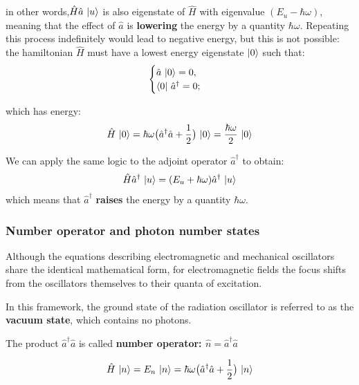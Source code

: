 in other words,$\hat{H}\hat{a}\, \ket{u}$ is also eigenstate of $\hat{H}$ with eigenvalue $(E_u-\hbar\omega)$, meaning that the effect of $\hat{a}$ is \textbf{lowering} the energy by a quantity $\hbar \omega$. Repeating this process indefinitely would lead to negative energy, but this is not possible: the hamiltonian $\hat{H}$ must have a lowest energy eigenstate $\ket{0}$ such that:
\begin{equation}\label{eqn:11-ground-state}
\begin{cases}
    \hat{a}\, \ket{0} = 0,\\
    \bra{0}\, \hat{a}^\dagger = 0;
\end{cases}
\end{equation}

which has energy:
\begin{equation}\label{eqn:11-ground-state-energy}
    \hat{H}\, \ket{0} = \hbar \omega \bigl(\hat{a}^\dagger\hat{a}+\frac{1}{2}\bigr) \, \ket{0} = \frac{\hbar \omega}{2}\, \ket{0}
\end{equation}

We can apply the same logic to the adjoint operator $\hat{a}^\dagger$ to obtain:
\[\hat{H}\hat{a}^\dagger\, \ket{u} = (E_u+\hbar\omega)\hat{a}^\dagger\, \ket{u}\]
which means that $\hat{a}^\dagger$ \textbf{raises} the energy by a quantity $\hbar \omega$.

\subsubsection{Number operator and photon number states}

Although the equations describing electromagnetic and mechanical oscillators share the identical mathematical form, for electromagnetic fields the focus shifts from the oscillators themselves to their quanta of excitation. 


In this framework, the ground state of the radiation oscillator is referred to as the \textbf{vacuum state}, which contains no photons.

The product $\hat{a}^\dagger\hat{a}$ is called \textbf{number operator: $\hat{n} =\hat{a}^\dagger\hat{a} $}

\begin{equation}\label{eqn:11-eigenvalue-equation-number-operator-1}
    \hat{H} \, \ket{n} = E_n \, \ket{n} = \hbar \omega 
    \bigl(\hat{a}^\dagger\hat{a}+\frac{1}{2}\bigr)\, \ket{n}
\end{equation}

